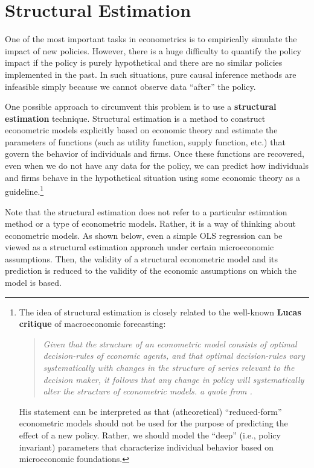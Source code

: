 \documentclass[11pt, A4paper, openany, uplatex]{book}
\begin{document}

\chapter{Structural Estimation}

One of the most important tasks in econometrics is to empirically simulate the impact of new policies.
However, there is a huge difficulty to quantify the policy impact if the policy is purely hypothetical and there are no similar policies implemented in the past.
In such situations, pure causal inference methods are infeasible simply because we cannot observe data ``after'' the policy.

One possible approach to circumvent this problem is to use a \textbf{structural estimation} technique.
Structural estimation is a method to construct econometric models explicitly based on economic theory and  estimate the parameters of functions (such as utility function, supply function, etc.) that govern the behavior of individuals and firms.
Once these functions are recovered, even when we do not have any data for the policy, we can predict how individuals and firms behave in the hypothetical situation using some economic theory as a guideline.\footnote{
	The idea of structural estimation is closely related to the well-known \textbf{Lucas critique} of macroeconomic forecasting:
	\begin{quote}\it
		Given that the structure of an econometric model consists of optimal decision-rules of economic agents, and that optimal decision-rules vary systematically with changes in the structure of series relevant to the decision maker, it follows that any change in policy will systematically alter the structure of econometric models. \upshape a quote from \cite{LUCAS197619}.
	\end{quote}
	His statement can be interpreted as that (atheoretical) ``reduced-form'' econometric models should not be used for the purpose of predicting the effect of a new policy.
	Rather, we should model the ``deep'' (i.e., policy invariant) parameters that characterize individual behavior based on microeconomic foundations.
	}

Note that the structural estimation does not refer to a particular estimation method or a type of econometric models.
Rather, it is a way of thinking about econometric models.
As shown below, even a simple OLS regression can be viewed as a structural estimation approach under certain microeconomic assumptions.
Then, the validity of a structural econometric model and its prediction is reduced to the validity of the economic assumptions on which the model is based.
\end{document}
